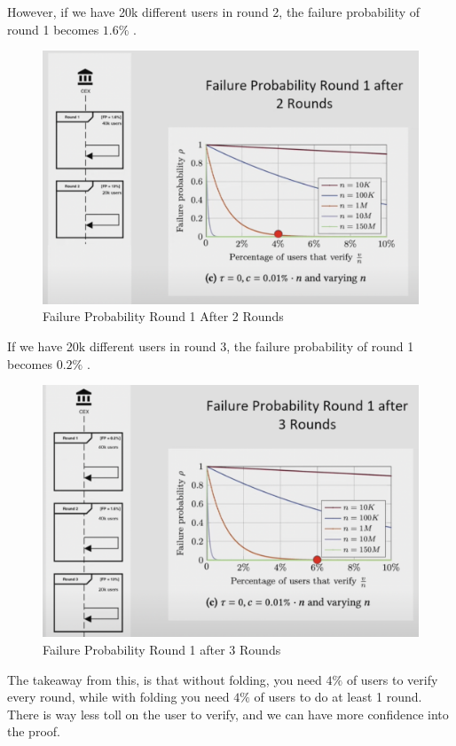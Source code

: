 However, if we have 20k different users in round 2, the failure probability of round 1 becomes $1.6\%$ .

        \begin{figure}[H]
            \centering
            \includegraphics[width=130mm]{FailureProbabilityRound2.png}
            \caption{Failure Probability Round 1 After 2 Rounds\cite{NS23}}
            \label{overflow}
            \end{figure}

            If we have 20k different users in round 3, the failure probability of round 1 becomes $0.2\%$ .

            \begin{figure}[H]
                \centering
                \includegraphics[width=130mm]{FailureProbabilityRound3.png}
                \caption{Failure Probability Round 1 after 3 Rounds \cite{NS23}}
                \label{overflow}
                \end{figure}
The takeaway from this, is that without folding, you need $4\%$ of users to verify every round, while with folding you need 
$4\%$  of users to do at least 1 round. There is way less toll on the user to verify, and we can have more confidence into the proof.

